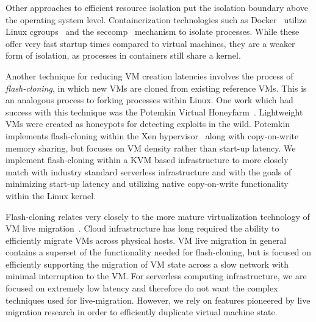 Other approaches to efficient resource isolation put the isolation boundary
above the operating system level. Containerization technologies such as
Docker~\cite{docker} utilize Linux cgroups~\cite{cgroups} and the
seccomp~\cite{seccomp} mechanism to isolate processes. While these offer very
fast startup times compared to virtual machines, they are a weaker form of
isolation, as processes in containers still share a kernel.

Another technique for reducing VM creation latencies involves the process of
\emph{flash-cloning}, in which new VMs are cloned from existing reference VMs.
This is an analogous process to forking processes within Linux. One work which
had success with this technique was the Potemkin Virtual
Honeyfarm~\cite{potemkin}. Lightweight VMs were created as honeypots for
detecting exploits in the wild. Potemkin implements flash-cloning within the
Xen hypervisor~\cite{xen} along with copy-on-write memory sharing, but focuses
on VM density rather than start-up latency. We implement flash-cloning within a
KVM based infrastructure to more closely match with industry standard
serverless infrastructure and with the goals of minimizing start-up latency and
utilizing native copy-on-write functionality within the Linux kernel.

 Flash-cloning relates very closely to the more
mature virtualization technology of VM live
migration~\cite{post-copy-migration}\cite{snowflock}. Cloud infrastructure has
long required the ability to efficiently migrate VMs across physical hosts. VM
live migration in general contains a superset of the functionality needed for
flash-cloning, but is focused on efficiently supporting the migration of VM
state across a slow network with minimal interruption to the VM. For serverless
computing infrastructure, we are focused on extremely low latency and therefore
do not want the complex techniques used for live-migration. However, we rely on
features pioneered by live migration research in order to efficiently duplicate
virtual machine state.
